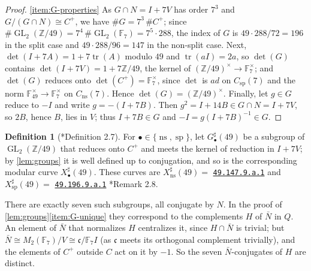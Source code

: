 \documentclass[12pt]{amsart}
\newcommand{\F}{{\mathbb F}}
\newcommand{\Z}{\mathbb{Z}}
\DeclareMathOperator{\ns}{ns}
\DeclareMathOperator{\spc}{sp}
\newcommand{\GL}{\operatorname{GL}}
\newcommand{\mclabel}[1]{\href{https://beta.lmfdb.org/ModularCurve/Q/#1}{\texttt{#1}}}
\numberwithin{equation}{section}
\theoremstyle{definition}
\newtheorem{definition}[theorem]{Definition}
\begin{document}
\begin{proof}
  \eqref{item:G-properties} As $G \cap N = I + 7V$ has order $7^{3}$
  and $G/(G \cap N) \cong C^{+}$, we have
  $\#G = 7^{3}\,\#C^{+}$; since
  $\#\GL_2(\Z/49) = 7^{4}\,\#\GL_2(\F_7) = 7^{5} \cdot 288$, the index of $G$
  is $49 \cdot 288/72 = 196$ in the split case and $49 \cdot 288/96 = 147$ in
  the non-split case. Next, $\det(I + 7A) = 1 + 7\operatorname{tr}(A)$ modulo
  $49$ and $\operatorname{tr}(aI) = 2a$, so $\det(G)$ contains
  $\det(I + 7V) = 1 + 7\Z/49$, the kernel of
  $(\Z/49)^{\times} \to \F_7^{\times}$; and $\det(G)$ reduces onto
  $\det(C^{+}) = \F_7^{\times}$, since $\det$ is $ad$ on
  $C_{\spc}(7)$ and the norm $\F_{49}^{\times} \to \F_7^{\times}$ on
  $C_{\ns}(7)$. Hence $\det(G) = (\Z/49)^{\times}$. Finally, let $g \in G$
  reduce to $-I$ and write $g = -(I + 7B)$. Then
  $g^{2} = I + 14B \in G \cap N = I + 7V$, so $2B$, hence $B$, lies in
  $V$; thus $I + 7B \in G$ and $-I = g(I + 7B)^{-1} \in G$.
\end{proof}

\begin{definition}[\cite{Furio--Lombardo26}*{Definition 2.7}]
  \label{def:G-sharp}
  For $\bullet \in \{\ns,\spc\}$, let $G_{\bullet}^{\sharp}(49)$ be a subgroup of
  $\GL_2(\Z/49)$ that reduces onto $C^{+}$ and meets the kernel of reduction in
  $I + 7V$; by \cref{lem:groups} it is well defined up to
  conjugation, and so is the
  corresponding modular curve $X_{\bullet}^{\sharp}(49)$. These curves are
  $X_{\ns}^{\sharp}(49) =$ \mclabel{49.147.9.a.1} and $X_{\spc}^{\sharp}(49) =$
  \mclabel{49.196.9.a.1} \cite{Furio--Lombardo26}*{Remark 2.8}.
\end{definition}

There are exactly seven such subgroups, all conjugate by $N$. In the proof of
\cref{lem:groups}\eqref{item:G-unique} they correspond to the complements $H$
of $\bar N$ in $Q$. An element of $\bar N$ that normalizes $H$ centralizes it,
since $H \cap \bar N$ is trivial; but
$\bar N \cong M_2(\F_7)/V \cong \mathfrak{c}/\F_7 I$ (as $\mathfrak{c}$ meets its orthogonal complement
trivially), and the elements of $C^{+}$ outside $C$ act on it by $-1$. So the
seven $\bar N$-conjugates of $H$ are distinct.
\end{document}
